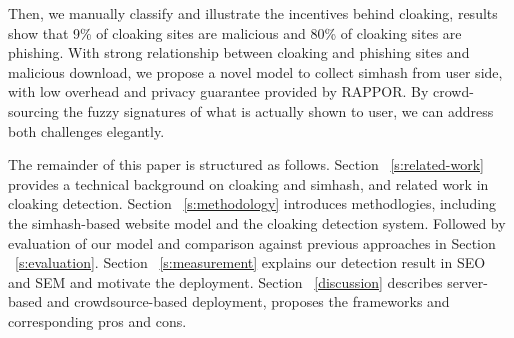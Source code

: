 Then, we manually classify and illustrate the incentives behind cloaking,
results show that 9\% of cloaking sites are malicious and 80\% of cloaking sites
are phishing. With strong relationship between cloaking and phishing sites
and malicious download,  we propose a novel model to collect simhash
%
%
from user side, with low overhead and privacy guarantee provided by RAPPOR.
By crowd-sourcing the fuzzy signatures of what is actually shown to user, we can
address both challenges elegantly.


%




%

%
%

The remainder of this paper is structured as follows. Section
~\autoref{s:related-work} provides a
technical background on cloaking and simhash, and related work in cloaking
detection. Section ~\autoref{s:methodology} introduces methodlogies, including the simhash-based website
model and the cloaking detection system.
Followed by evaluation of our model and comparison against previous approaches
in Section ~\autoref{s:evaluation}.
Section ~\autoref{s:measurement} explains our detection result in SEO and SEM
and motivate the deployment.
Section ~\autoref{discussion} describes server-based and crowdsource-based
deployment, proposes the frameworks and corresponding pros and cons.




